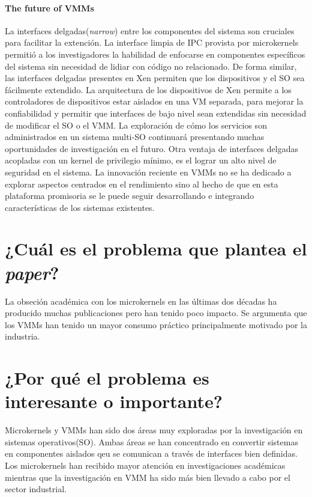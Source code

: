 \paragraph{\textnormal{\textbf{The future of VMMs}}}
La interfaces delgadas(\emph{narrow}) entre los componentes del sistema son cruciales para facilitar la extención. La interface limpia de IPC provista por microkernels permitió a los investigadores la habilidad de enfocarse en componentes específicos del sistema sin necesidad de lidiar con código no relacionado. De forma similar, las interfaces delgadas presentes en Xen permiten que los dispositivos y el SO sea fácilmente extendido. La arquitectura de los dispositivos de Xen permite a los controladores de dispositivos estar aislados en una VM separada, para mejorar la confiabilidad y permitir que interfaces de bajo nivel sean extendidas sin necesidad de modificar el SO o el VMM. La exploración de cómo los servicios son administrados en un sistema multi-SO continuará presentando muchas oportunidades de investigación en el futuro. Otra ventaja de interfaces delgadas acopladas con un kernel de privilegio mínimo, es el lograr un alto nivel de seguridad en el sistema. La innovación reciente en VMMs no se ha dedicado a explorar aspectos centrados en el rendimiento sino al hecho de que en esta plataforma promisoria se le puede seguir desarrollando e integrando características de los sistemas existentes.

\section{¿Cuál es el problema que plantea el \textit{paper}?}
La obseción académica con los microkernels en las últimas dos décadas ha producido muchas publicaciones pero han tenido poco impacto. Se argumenta que los VMMs han tenido un mayor consumo práctico principalmente motivado por la industria.

\section{¿Por qué el problema es interesante o importante?}
Microkernels y VMMs han sido dos áreas muy exploradas por la investigación en sistemas operativos(SO). Ambas áreas se han concentrado en convertir sistemas en componentes aislados qeu se comunican a través de interfaces bien definidas. Los microkernels han recibido mayor atención en investigaciones académicas mientras que la investigación en VMM ha sido más bien llevado a cabo por el sector industrial.

